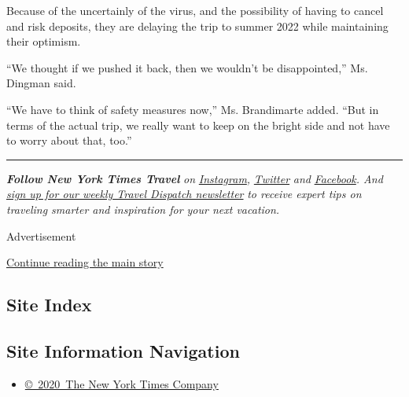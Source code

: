 Because of the uncertainly of the virus, and the possibility of having
to cancel and risk deposits, they are delaying the trip to summer 2022
while maintaining their optimism.

``We thought if we pushed it back, then we wouldn't be disappointed,''
Ms. Dingman said.

``We have to think of safety measures now,'' Ms. Brandimarte added.
``But in terms of the actual trip, we really want to keep on the bright
side and not have to worry about that, too.''

\begin{center}\rule{0.5\linewidth}{\linethickness}\end{center}

\emph{\textbf{Follow New York Times Travel}} \emph{on}
\href{https://www.instagram.com/nytimestravel/}{\emph{Instagram}}\emph{,}
\href{https://twitter.com/nytimestravel}{\emph{Twitter}} \emph{and}
\href{https://www.facebookcorewwwi.onion/nytimestravel/}{\emph{Facebook}}\emph{.
And}
\href{https://www.nytimes3xbfgragh.onion/newsletters/traveldispatch}{\emph{sign
up for our weekly Travel Dispatch newsletter}} \emph{to receive expert
tips on traveling smarter and inspiration for your next vacation.}

Advertisement

\protect\hyperlink{after-bottom}{Continue reading the main story}

\hypertarget{site-index}{%
\subsection{Site Index}\label{site-index}}

\hypertarget{site-information-navigation}{%
\subsection{Site Information
Navigation}\label{site-information-navigation}}

\begin{itemize}
\tightlist
\item
  \href{https://help.nytimes3xbfgragh.onion/hc/en-us/articles/115014792127-Copyright-notice}{©~2020~The
  New York Times Company}
\end{itemize}

